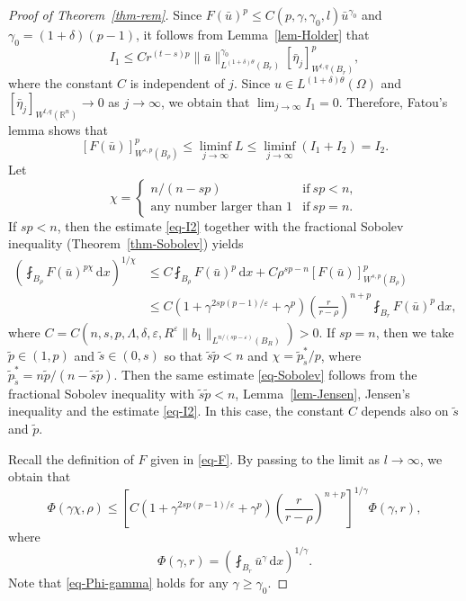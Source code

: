 \documentclass[11pt]{amsart}
\theoremstyle{plain}
\theoremstyle{definition}
\numberwithin{equation}{section}
\begin{document}
\begin{proof}[Proof of Theorem~\ref{thm-rem}]
Since $F(\bar{u})^p \leq C(p, \gamma, \gamma_0, l) \bar{u}^{\gamma_0}$ and $\gamma_0 = (1+\delta)(p-1)$, it follows from Lemma~\ref{lem-Holder} that
\begin{equation*}
I_1 \leq C r^{(t-s)p} \|\bar{u}\|_{L^{(1+\delta)\theta}(B_r)}^{\gamma_0} [\bar{\eta}_j]_{W^{t, q}(B_r)}^p,
\end{equation*}
where the constant $C$ is independent of $j$. Since $u \in L^{(1+\delta)\theta}(\Omega)$ and $[\bar{\eta}_j]_{W^{t, q}(\mathbb{R}^n)} \to 0$ as $j \to \infty$, we obtain that $\lim_{j \to \infty} {I_1}=0$. Therefore, Fatou's lemma shows that
\begin{equation}\label{eq-I2}
[F(\bar{u})]_{W^{s, p}(B_\rho)}^p \leq \liminf_{j \to \infty} {L} \leq \liminf_{j \to \infty} {(I_1+I_2)} = I_2.
\end{equation}
Let
\begin{equation*}
\chi=
\begin{cases}
n/(n-sp) &\text{if}~sp<n, \\
\text{any number larger than 1} &\text{if}~sp=n.
\end{cases}
\end{equation*}
If $sp < n$, then the estimate \eqref{eq-I2} together with the fractional Sobolev inequality (Theorem~\ref{thm-Sobolev}) yields
\begin{equation}\label{eq-Sobolev}
\begin{split}
\left( \fint_{B_\rho} F(\bar{u})^{p\chi} \,\mathrm{d}x \right)^{1/\chi}
&\leq C \fint_{B_\rho} F(\bar{u})^p \,\mathrm{d}x + C\rho^{sp-n} [F(\bar{u})]_{W^{s, p}(B_\rho)}^p \\
&\leq C\left(1+\gamma^{2sp(p-1)/\varepsilon} + \gamma^p \right) \left( \frac{r}{r-\rho} \right)^{n+p} \fint_{B_r} F(\bar{u})^p \,\mathrm{d}x,
\end{split}
\end{equation}
where $C=C(n, s, p, \Lambda, \delta, \varepsilon, R^\varepsilon \|b_1\|_{L^{n/(sp-\varepsilon)}(B_R)})>0$. If $sp=n$, then we take $\tilde{p} \in (1, p)$ and $\tilde{s} \in (0, s)$ so that $\tilde{s} \tilde{p} < n$ and $\chi=\tilde{p}_{\tilde{s}}^\ast/p$, where $\tilde{p}_{\tilde{s}}^\ast = n\tilde{p}/(n-\tilde{s} \tilde{p})$. Then the same estimate \eqref{eq-Sobolev} follows from the fractional Sobolev inequality with $\tilde{s}\tilde{p}<n$, Lemma~\ref{lem-Jensen}, Jensen's inequality and the estimate \eqref{eq-I2}. In this case, the constant $C$ depends also on $\tilde{s}$ and $\tilde{p}$.

Recall the definition of $F$ given in \eqref{eq-F}. By passing to the limit as $l\to\infty$, we obtain that
\begin{equation}\label{eq-Phi-gamma}
\Phi(\gamma \chi, \rho) \leq \left[ C\left( 1 + \gamma^{2sp(p-1)/\varepsilon} + \gamma^p \right) \left( \frac{r}{r-\rho} \right)^{n+p} \right]^{1/\gamma} \Phi(\gamma, r),
\end{equation}
where
\begin{equation*}
\Phi(\gamma, r) = \left( \fint_{B_r} \bar{u}^{\gamma} \,\mathrm{d}x \right)^{1/\gamma}.
\end{equation*}
Note that \eqref{eq-Phi-gamma} holds for any $\gamma \geq \gamma_0$.


\end{proof}
\end{document}
